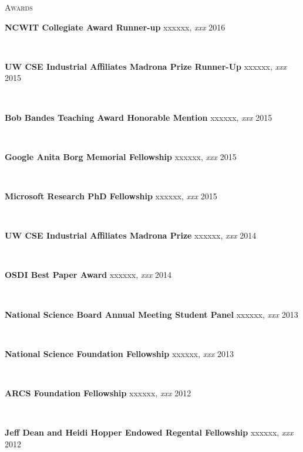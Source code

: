 \documentclass[10pt,times]{report}
\newlength{\sectiongap}
\newlength{\entrygap}
\newlength{\sectioncolwidth}
\newlength{\colgap}
\newlength{\stuffwidth}
\def\ifEqString#1#2{\def\testa{#1}\def\testb{#2}%
  \ifx\testa\testb}
\newenvironment{rtable}{
  \begin{minipage}{\textwidth}
  }{
  \end{minipage}
}
\newenvironment{rentry}[3][xxx]{
  \begin{minipage}[t]{\hsize}
    \textbf{#2}\ifEqString{#1}{xxx}\relax\else, \textit{#1}\fi
    \hspace{\stretch{1}} #3 \\
  }{
    \removelastskip
  \end{minipage}
  \\[\entrygap]  %
}
\newenvironment{rsection}[1]{
  \begin{minipage}[t]{\sectioncolwidth}
    \textsc{#1}
  \end{minipage}
  \hspace{\colgap}
  \begin{minipage}[t]{\stuffwidth}
  }{
    \removelastskip
  \end{minipage}
  \\[\sectiongap]
}
\begin{document}
\begin{rtable}
  \begin{rsection}{Awards}
    \begin{rentry}{NCWIT Collegiate Award Runner-up}{2016}
      \vspace{-0.5em}
    \end{rentry} 
    \begin{rentry}{UW CSE Industrial Affiliates Madrona Prize Runner-Up}{2015}
      \vspace{-0.5em}
    \end{rentry} 
    \begin{rentry}{Bob Bandes Teaching Award Honorable Mention}{2015}
      \vspace{-0.5em}
    \end{rentry} 
    \begin{rentry}{Google Anita Borg Memorial Fellowship}{2015}
      \vspace{-0.5em}
    \end{rentry} 
    \begin{rentry}{Microsoft Research PhD Fellowship}{2015}
      \vspace{-0.5em}
    \end{rentry} 
    \begin{rentry}{UW CSE Industrial Affiliates Madrona Prize}{2014}
       \vspace{-0.5em}
    \end{rentry}
    \begin{rentry}{OSDI Best Paper Award}{2014}
      \vspace{-0.5em}
    \end{rentry}
    \begin{rentry}{National Science Board Annual Meeting Student
        Panel}{2013}
      \vspace{-0.5em}
    \end{rentry}
    \begin{rentry}{National Science Foundation Fellowship}{2013}
      \vspace{-0.5em}
    \end{rentry}
    \begin{rentry}{ARCS Foundation Fellowship}{2012}
       \vspace{-0.5em}
    \end{rentry}
    \begin{rentry}{Jeff Dean and Heidi Hopper Endowed Regental Fellowship}{2012}

\end{rentry}
\end{rsection}
\end{rtable}
\end{document}
